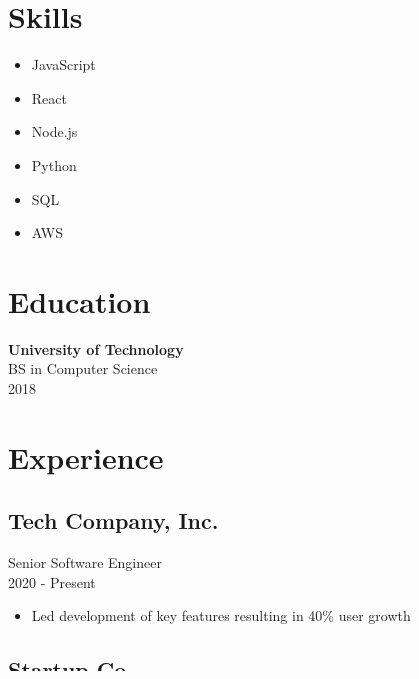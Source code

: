 \documentclass[11pt,a4paper]{article}
\begin{document}
\begin{minipage}[t]{0.3\textwidth}
    \section*{\textcolor{primary}{Skills}}
    \begin{itemize}[leftmargin=*]
        \item JavaScript
        \item React
        \item Node.js
        \item Python
        \item SQL
        \item AWS
    \end{itemize}

    \section*{\textcolor{primary}{Education}}
    \textbf{University of Technology}\\
    BS in Computer Science\\
    \textcolor{subtext}{2018}
\end{minipage}
\hfill
\begin{minipage}[t]{0.65\textwidth}
    \section*{\textcolor{primary}{Experience}}
    
    \subsection*{Tech Company, Inc.}
    \textcolor{primary}{Senior Software Engineer}\\
    \textcolor{subtext}{2020 - Present}\\[4pt]
    \begin{itemize}[leftmargin=*]
        \item Led development of key features resulting in 40\% user growth
    \end{itemize}

    \subsection*{Startup Co.}
    \textcolor{primary}{Software Engineer}\\
    \textcolor{subtext}{2018 - 2020}\\[4pt]
    \begin{itemize}[leftmargin=*]
        \item Developed and maintained core application features
    \end{itemize}
\end{minipage}
\end{document}

